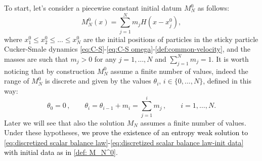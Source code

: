 \documentclass[11pt,a4paper,oneside]{amsart}
\begin{document}
To start, let's consider a piecewise constant initial datum $M_N^0$ as follows:
\begin{equation}\label{def: M_N^0}
    M_N^0(x)=\sum_{j=1}^N m_jH(x-x_j^0),
\end{equation}
where $x_1^0\leq x_2^0\leq ...\leq x^0_N$ are the initial positions of particles in the sticky particle 
Cucker-Smale dynamics \eqref{eq:C-S}-\eqref{eq:C-S omega}-\eqref{def:common-velocity}, %
and the masses are such that $m_j>0$ 
for any $j=1,\dots,N$ and $\displaystyle{\sum_{j=1}^N} m_j=1$. 
\newline
It is worth noticing that by construction $M_N^0$ assume a finite number of values, indeed the range of $M_N^0$ 
is discrete and given by the values $\theta_i,\, i\in\{0,...,N\}$, defined in this way:
\begin{equation}\label{def: theta_i}
   \theta_0=0\,,\qquad \theta_i= \theta_{i-1}+ m_i = \sum_{j=1}^i m_j\,,\qquad i=1,\ldots,N.
\end{equation}
Later we will see that also the solution $M_N$ assumes a finite number of values.
\newline
Under these hypotheses, \textcolor{black}{we prove the existence of an entropy weak solution to \eqref{eq:discretized scalar balance law}-\eqref{eq:discretized scalar balance law-init data} with initial data as in \eqref{def: M_N^0}}.%
\end{document}
